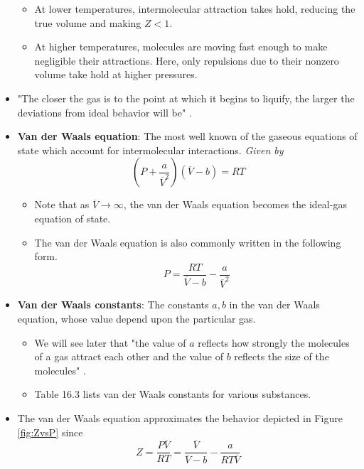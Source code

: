 \documentclass[../notes.tex]{subfiles}
\begin{document}
\begin{itemize}
\begin{itemize}
        \item At lower temperatures, intermolecular attraction takes hold, reducing the true volume and making $Z<1$.
        \item At higher temperatures, molecules are moving fast enough to make negligible their attractions. Here, only repulsions due to their nonzero volume take hold at higher pressures.
    \end{itemize}
    \item "The closer the gas is to the point at which it begins to liquify, the larger the deviations from ideal behavior will be" \parencite[642]{bib:McQuarrieSimon}.
    \item \textbf{Van der Waals equation}: The most well known of the gaseous equations of state which account for intermolecular interactions. \emph{Given by}
    \begin{equation*}
        \left( P+\frac{a}{\overline{V}^2} \right)(\overline{V}-b) = RT
    \end{equation*}
    \begin{itemize}
        \item Note that as $\overline{V}\to\infty$, the van der Waals equation becomes the ideal-gas equation of state.
        \item The van der Waals equation is also commonly written in the following form.
        \begin{equation*}
            P = \frac{RT}{\overline{V}-b}-\frac{a}{\overline{V}^2}
        \end{equation*}
    \end{itemize}
    \item \textbf{Van der Waals constants}: The constants $a,b$ in the van der Waals equation, whose value depend upon the particular gas.
    \begin{itemize}
        \item We will see later that "the value of $a$ reflects how strongly the molecules of a gas attract each other and the value of $b$ reflects the size of the molecules" \parencite[643]{bib:McQuarrieSimon}.
        \item Table 16.3 lists van der Waals constants for various substances.
    \end{itemize}
    \item The van der Waals equation approximates the behavior depicted in Figure \ref{fig:ZvsP} since
    \begin{equation*}
        Z = \frac{P\overline{V}}{RT}
        = \frac{\overline{V}}{\overline{V}-b}-\frac{a}{RT\overline{V}}

\end{equation*}
\end{itemize}
\end{document}
